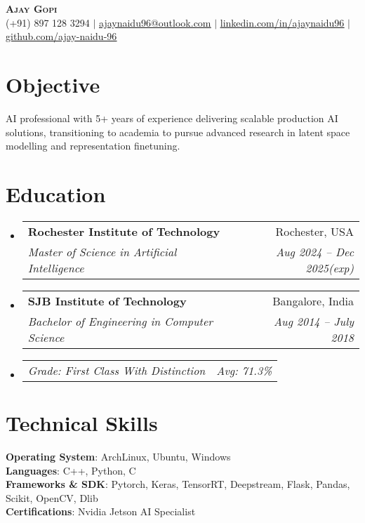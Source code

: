 \documentclass[letterpaper,10pt]{article}
\makeatletter
\newcommand{\resumeSubheading}[4]{
  \vspace{-2pt}\item
    \begin{tabular*}{0.97\textwidth}[t]{l@{\extracolsep{\fill}}r}
      \textbf{#1} & #2 \\
      \textit{\small#3} & \textit{\small #4} \\
    \end{tabular*}\vspace{-7pt}
}
\newcommand{\resumeSubSubheading}[2]{
    \item
    \begin{tabular*}{0.97\textwidth}{l@{\extracolsep{\fill}}r}
      \textit{\small#1} & \textit{\small #2} \\
    \end{tabular*}\vspace{-7pt}
}
\newcommand{\resumeSubHeadingListStart}{\begin{itemize}[leftmargin=0.15in, label={}]}
\newcommand{\resumeSubHeadingListEnd}{\end{itemize}}
\makeatother
\begin{document}
\begin{center}
    \textbf{\Huge \scshape Ajay Gopi} \\ \vspace{1pt}
    \small (+91) 897 128 3294 $|$ \href{mailto:ajaynaidu96@outlook.com}{\underline{ajaynaidu96@outlook.com}} $|$ 
    \href{https://www.linkedin.com/in/ajaynaidu96/}{\underline{linkedin.com/in/ajaynaidu96}} $|$
    \href{https://github.com/ajay-naidu-96/}{\underline{github.com/ajay-naidu-96}}
\end{center}

\section{Objective}
AI professional with 5+ years of experience delivering scalable production AI solutions, transitioning to academia to pursue advanced research in latent space modelling and representation finetuning.

\section{Education}
\resumeSubHeadingListStart
  \resumeSubheading
    {Rochester Institute of Technology}{Rochester, USA}
    {Master of Science in Artificial Intelligence}{Aug 2024 -- Dec 2025(exp)}
  \resumeSubheading
    {SJB Institute of Technology}{Bangalore, India}
    {Bachelor of Engineering in Computer Science}{Aug 2014 -- July 2018}
    \resumeSubSubheading
      {Grade: First Class With Distinction}{Avg: 71.3\%}
\resumeSubHeadingListEnd

  \section{Technical Skills}
    \begin{itemize}[leftmargin=0.15in, label={}]
      \small{\item{
      \textbf{Operating System}{: ArchLinux, Ubuntu, Windows} \\
      \textbf{Languages}{: C++, Python, C} \\
      \textbf{Frameworks \& SDK}{: Pytorch, Keras, TensorRT, Deepstream, Flask, Pandas, Scikit, OpenCV, Dlib} \\
      \textbf{Certifications}{: Nvidia Jetson AI Specialist}
      }}
    \end{itemize}
\end{document}

